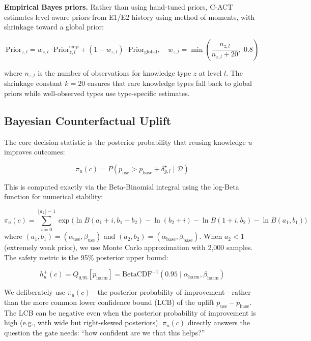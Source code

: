 \documentclass[letterpaper]{article}
\begin{document}
\textbf{Empirical Bayes priors.} Rather than using hand-tuned priors, \textsc{C-ACT} estimates level-aware priors from E1/E2 history using method-of-moments, with shrinkage toward a global prior:

\begin{equation}
\text{Prior}_{z,l} = w_{z,l} \cdot \text{Prior}_{z,l}^{\text{emp}} + (1 - w_{z,l}) \cdot \text{Prior}_{\text{global}}, \quad w_{z,l} = \min\left(\frac{n_{z,l}}{n_{z,l} + 20}, \; 0.8\right)
\end{equation}

where $n_{z,l}$ is the number of observations for knowledge type $z$ at level $l$. The shrinkage constant $k=20$ ensures that rare knowledge types fall back to global priors while well-observed types use type-specific estimates.

\subsection{Bayesian Counterfactual Uplift}

The core decision statistic is the posterior probability that reusing knowledge $u$ improves outcomes:

\begin{equation}
\boxed{\pi_u(c) = P(p_{\text{use}} > p_{\text{base}} + \delta_{g,l}^\star \mid \mathcal{D})}
\end{equation}

This is computed exactly via the Beta-Binomial integral using the log-Beta function for numerical stability:

\begin{equation}
\pi_u(c) = \sum_{i=0}^{\lfloor a_2 \rfloor - 1} \exp\bigl(\ln B(a_1 + i, b_1 + b_2) - \ln(b_2 + i) - \ln B(1 + i, b_2) - \ln B(a_1, b_1)\bigr)
\end{equation}
where $(a_1, b_1) = (\alpha_{\text{use}}, \beta_{\text{use}})$ and $(a_2, b_2) = (\alpha_{\text{base}}, \beta_{\text{base}})$. When $a_2 < 1$ (extremely weak prior), we use Monte Carlo approximation with 2,000 samples. The safety metric is the 95\% posterior upper bound:

\begin{equation}
h_u^+(c) = Q_{0.95}[p_{\text{harm}}] = \text{BetaCDF}^{-1}(0.95 \mid \alpha_{\text{harm}}, \beta_{\text{harm}})
\end{equation}

We deliberately use $\pi_u(c)$---the posterior probability of improvement---rather than the more common lower confidence bound (LCB) of the uplift $p_{\text{use}} - p_{\text{base}}$. The LCB can be negative even when the posterior probability of improvement is high (e.g., with wide but right-skewed posteriors). $\pi_u(c)$ directly answers the question the gate needs: ``how confident are we that this helps?''
\end{document}
